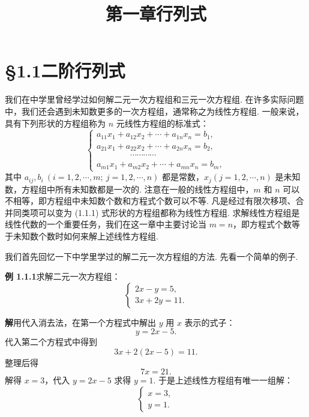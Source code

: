\documentclass[UTF8, 12pt, fontset=fandol, oneside]{ctexart}
\title{第一章\quad 行列式}
\author{}
\date{}
\begin{document}
\maketitle

\section*{§1.1\quad 二阶行列式}

我们在中学里曾经学过如何解二元一次方程组和三元一次方程组. 在许多实际问题中，我们还会遇到未知数更多的一次方程组，通常称之为线性方程组. 一般来说，具有下列形状的方程组称为 $n$ 元线性方程组的标准式：
\begin{equation}
\left\{
\begin{array}{l}
a_{11}x_1+a_{12}x_2+\cdots+a_{1n}x_n=b_1,\\
a_{21}x_1+a_{22}x_2+\cdots+a_{2n}x_n=b_2,\\
\hspace{4em}\cdots\cdots\cdots\cdots\\
a_{m1}x_1+a_{m2}x_2+\cdots+a_{mn}x_n=b_m,
\end{array}
\right.
\tag{1.1.1}
\end{equation}
其中 $a_{ij}, b_i\ (i=1,2,\cdots,m;\ j=1,2,\cdots,n)$ 都是常数，$x_j(j=1,2,\cdots,n)$ 是未知数，方程组中所有未知数都是一次的. 注意在一般的线性方程组中，$m$ 和 $n$ 可以不相等，即方程组中未知数个数和方程式个数可以不等. 凡是经过有限次移项、合并同类项可以变为 (1.1.1) 式形状的方程组都称为线性方程组. 求解线性方程组是线性代数的一个重要任务，我们在这一章中主要讨论当 $m=n$，即方程式个数等于未知数个数时如何来解上述线性方程组.

我们首先回忆一下中学里学过的解二元一次方程组的方法. 先看一个简单的例子.

\noindent\textbf{例 1.1.1}\quad 求解二元一次方程组：
\begin{equation}
\left\{
\begin{array}{l}
2x-y=5,\\
3x+2y=11.
\end{array}
\right.
\tag{1.1.2}
\end{equation}

\noindent\textbf{解}\quad 用代入消去法，在第一个方程式中解出 $y$ 用 $x$ 表示的式子：
\[
y=2x-5.
\]
代入第二个方程式中得到
\[
3x+2(2x-5)=11.
\]
整理后得
\[
7x=21.
\]
解得 $x=3$，代入 $y=2x-5$ 求得 $y=1$. 于是上述线性方程组有唯一一组解：
\[
\left\{
\begin{array}{l}
x=3,\\
y=1.
\end{array}
\right.
\]
\end{document}
